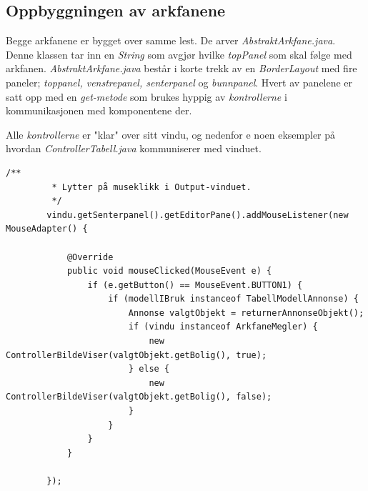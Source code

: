 \subsection{Oppbyggningen av arkfanene}
Begge arkfanene er bygget over samme lest. De arver \emph{AbstraktArkfane.java}. Denne klassen tar inn en \emph{String} som avgjør hvilke \emph{topPanel} som skal følge med arkfanen.
\emph{AbstraktArkfane.java} består i korte trekk av en \emph{BorderLayout} med fire paneler; \emph{toppanel, venstrepanel, senterpanel} og \emph{bunnpanel}.
Hvert av panelene er satt opp med en \emph{get-metode} som brukes hyppig av \emph{kontrollerne} i kommunikasjonen med komponentene der.

Alle \emph{kontrollerne} er "klar" over sitt vindu, og nedenfor e noen eksempler på hvordan \emph{ControllerTabell.java} kommuniserer med vinduet.

\begin{lstlisting}[caption=Kodeeksempel på hvordan \emph{ControllerTabell.java} kommuniserer med brukergrensesnittet]
        /**
         * Lytter på museklikk i Output-vinduet.
         */
        vindu.getSenterpanel().getEditorPane().addMouseListener(new MouseAdapter() {

            @Override
            public void mouseClicked(MouseEvent e) {
                if (e.getButton() == MouseEvent.BUTTON1) {
                    if (modellIBruk instanceof TabellModellAnnonse) {
                        Annonse valgtObjekt = returnerAnnonseObjekt();
                        if (vindu instanceof ArkfaneMegler) {
                            new ControllerBildeViser(valgtObjekt.getBolig(), true);
                        } else {
                            new ControllerBildeViser(valgtObjekt.getBolig(), false);
                        }
                    }
                }
            }

        });
\end{lstlisting}